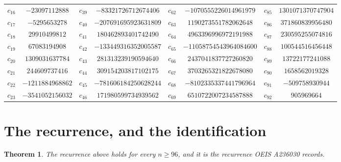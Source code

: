\documentclass[11pt,a4paper]{article}
\theoremstyle{plain}
\newtheorem{theorem}{Theorem}
\theoremstyle{definition}
\begin{document}
\begin{center}
\begin{tabular}{cccccccc}
$c_{16}$ & $-23097112888$ & $c_{39}$ & $-83321726712674406$ & $c_{62}$ & $-1070555226014961979$ & $c_{85}$ & $1301071370747904$ \\
$c_{17}$ & $-5295653278$ & $c_{40}$ & $-207691695923631809$ & $c_{63}$ & $1190273551782062648$ & $c_{86}$ & $371860839956480$ \\
$c_{18}$ & $29910499812$ & $c_{41}$ & $180462893401742490$ & $c_{64}$ & $4963396996972191988$ & $c_{87}$ & $230595255074816$ \\
$c_{19}$ & $67083194908$ & $c_{42}$ & $-133449316352005587$ & $c_{65}$ & $-11058754543964084600$ & $c_{88}$ & $100544516456448$ \\
$c_{20}$ & $1309031637784$ & $c_{43}$ & $281313239190594640$ & $c_{66}$ & $2437041837727260820$ & $c_{89}$ & $13722177241088$ \\
$c_{21}$ & $244609737416$ & $c_{44}$ & $309154203817102175$ & $c_{67}$ & $3703265321822678080$ & $c_{90}$ & $1658562019328$ \\
$c_{22}$ & $-1211884968862$ & $c_{45}$ & $-781606184250628244$ & $c_{68}$ & $-8102335337441796964$ & $c_{91}$ & $-509758930944$ \\
$c_{23}$ & $-3541052156032$ & $c_{46}$ & $171980599734939562$ & $c_{69}$ & $6510722007234587888$ & $c_{92}$ & $905969664$ \\
\end{tabular}
\end{center}

\section{The recurrence, and the identification}

\begin{theorem}
The recurrence above holds for every $n\ge96$, and it is the recurrence OEIS A236030 records.
\end{theorem}
\end{document}
